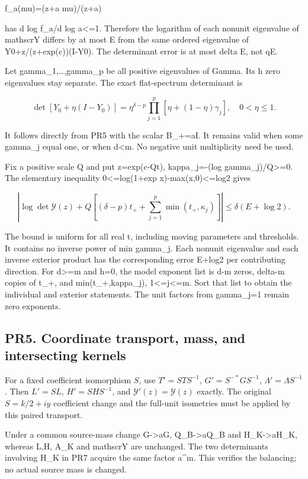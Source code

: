 \documentclass[11pt]{article}
\begin{document}
f\_a(mu)=(z+a mu)/(z+a)

has \textbar d log f\_a/d log a\textbar\textless=1. Therefore the logarithm of each nonunit eigenvalue of mathscrY differs by at most E from the same ordered eigenvalue of Y0+z/(z+exp(c))(I-Y0). The determinant error is at most delta E, not qE.

Let gamma\_1,\ldots,gamma\_p be all positive eigenvalues of Gamma. Its h zero eigenvalues stay separate. The exact flat-spectrum determinant is

\[
\det[Y_0+\eta(I-Y_0)]
=\eta^{\delta-p}\prod_{j=1}^{p}[\eta+(1-\eta)\gamma_j],
\quad 0<\eta\le1.
\tag{PR14}
\]

It follows directly from PR5 with the scalar B\_+=aI. It remains valid when some gamma\_j equal one, or when d\textless m. No negative unit multiplicity need be used.

Fix a positive scale Q and put z=exp(c-Qt), kappa\_j=-(log gamma\_j)/Q\textgreater=0. The elementary inequality 0\textless=log(1+exp x)-max(x,0)\textless=log2 gives

\[
\boxed{
\left|\log\det\mathscr Y(z)
+Q\left[(\delta-p)t_++\sum_{j=1}^{p}\min(t_+,\kappa_j)\right]\right|
\le\delta(E+\log2).
}
\tag{PR15}
\]

The bound is uniform for all real t, including moving parameters and thresholds. It contains no inverse power of min gamma\_j. Each nonunit eigenvalue and each inverse exterior product has the corresponding error E+log2 per contributing direction. For d\textgreater=m and h=0, the model exponent list is d-m zeros, delta-m copies of t\_+, and min(t\_+,kappa\_j), 1\textless=j\textless=m. Sort that list to obtain the individual and exterior statements. The unit factors from gamma\_j=1 remain zero exponents.

\subsection{PR5. Coordinate transport, mass, and intersecting kernels}\label{pr5.-coordinate-transport-mass-and-intersecting-kernels}

For a fixed coefficient isomorphism \(S\), use \(T'=STS^{-1}\), \(G'=S^{-*}GS^{-1}\), \(\Lambda'=\Lambda S^{-1}\). Then \(L'=SL\), \(H'=SHS^{-1}\), and \(\mathscr Y'(z)=\mathscr Y(z)\) exactly. The original \(S=k/2+iy\) coefficient change and the full-unit isometries must be applied by this paired transport.

Under a common source-mass change G-\textgreater aG, Q\_B-\textgreater aQ\_B and H\_K-\textgreater aH\_K, whereas L,H, A\_K and mathscrY are unchanged. The two determinants involving H\_K in PR7 acquire the same factor a\^{}m. This verifies the balancing; no actual source mass is changed.
\end{document}
